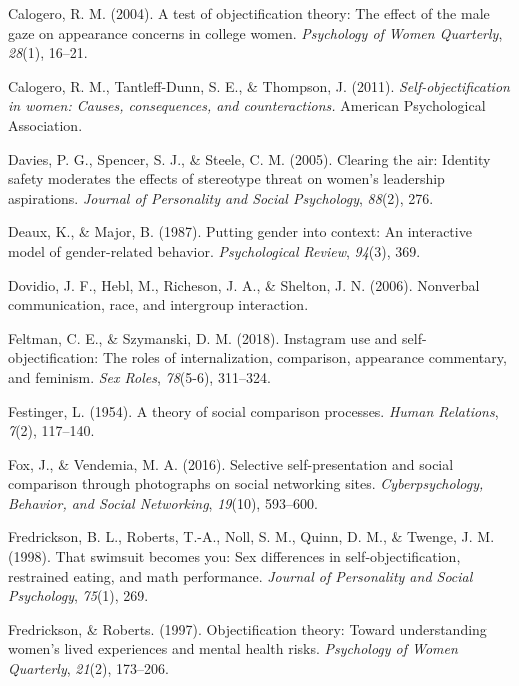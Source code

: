 \documentclass[man]{apa6}
\begin{document}
\hypertarget{ref-calogero2004test}{}
Calogero, R. M. (2004). A test of objectification theory: The effect of
the male gaze on appearance concerns in college women. \emph{Psychology
of Women Quarterly}, \emph{28}(1), 16--21.

\hypertarget{ref-calogero2011}{}
Calogero, R. M., Tantleff-Dunn, S. E., \& Thompson, J. (2011).
\emph{Self-objectification in women: Causes, consequences, and
counteractions.} American Psychological Association.

\hypertarget{ref-davies2005clearing}{}
Davies, P. G., Spencer, S. J., \& Steele, C. M. (2005). Clearing the
air: Identity safety moderates the effects of stereotype threat on
women's leadership aspirations. \emph{Journal of Personality and Social
Psychology}, \emph{88}(2), 276.

\hypertarget{ref-deaux1987putting}{}
Deaux, K., \& Major, B. (1987). Putting gender into context: An
interactive model of gender-related behavior. \emph{Psychological
Review}, \emph{94}(3), 369.

\hypertarget{ref-dovidio2006nonverbal}{}
Dovidio, J. F., Hebl, M., Richeson, J. A., \& Shelton, J. N. (2006).
Nonverbal communication, race, and intergroup interaction.

\hypertarget{ref-feltman2018instagram}{}
Feltman, C. E., \& Szymanski, D. M. (2018). Instagram use and
self-objectification: The roles of internalization, comparison,
appearance commentary, and feminism. \emph{Sex Roles}, \emph{78}(5-6),
311--324.

\hypertarget{ref-festinger1954theory}{}
Festinger, L. (1954). A theory of social comparison processes.
\emph{Human Relations}, \emph{7}(2), 117--140.

\hypertarget{ref-fox2016selective}{}
Fox, J., \& Vendemia, M. A. (2016). Selective self-presentation and
social comparison through photographs on social networking sites.
\emph{Cyberpsychology, Behavior, and Social Networking}, \emph{19}(10),
593--600.

\hypertarget{ref-fredrickson1998swimsuit}{}
Fredrickson, B. L., Roberts, T.-A., Noll, S. M., Quinn, D. M., \&
Twenge, J. M. (1998). That swimsuit becomes you: Sex differences in
self-objectification, restrained eating, and math performance.
\emph{Journal of Personality and Social Psychology}, \emph{75}(1), 269.

\hypertarget{ref-robertsfredrickson}{}
Fredrickson, \& Roberts. (1997). Objectification theory: Toward
understanding women's lived experiences and mental health risks.
\emph{Psychology of Women Quarterly}, \emph{21}(2), 173--206.
\end{document}
